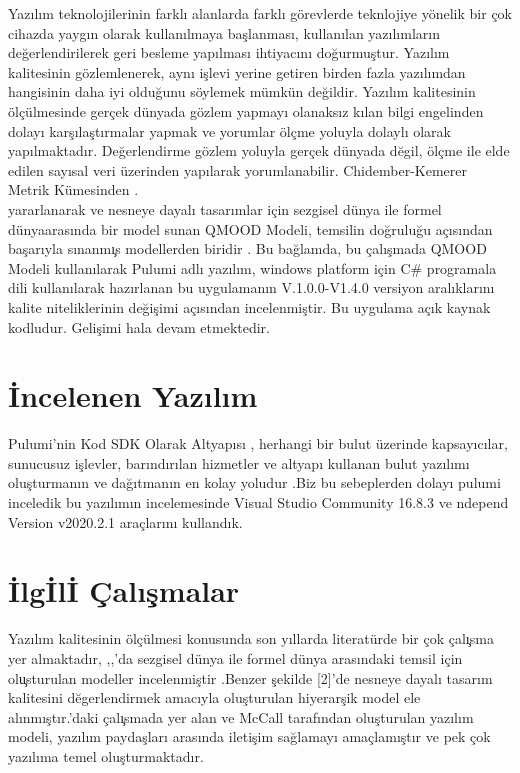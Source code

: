 \documentclass[conference]{IEEEtran}
\begin{document}
Yazılım teknolojilerinin farklı alanlarda farklı görevlerde teknlojiye yönelik bir çok cihazda yaygın olarak kullanılmaya başlanması, kullanılan yazılımların değerlendirilerek geri besleme yapılması ihtiyacını doğurmuştur. Yazılım  kalitesinin gözlemlenerek, aynı işlevi yerine getiren birden fazla yazılımdan hangisinin daha iyi olduğunu söylemek mümkün değildir. Yazılım kalitesinin ölçülmesinde gerçek dünyada gözlem yapmayı olanaksız kılan bilgi engelinden dolayı karşılaştırmalar yapmak ve yorumlar ölçme yoluyla dolaylı olarak yapılmaktadır. Değerlendirme gözlem yoluyla gerçek dünyada dĕgil, ölçme  ile elde  edilen sayısal veri üzerinden yapılarak yorumlanabilir. Chidember-Kemerer  Metrik  Kümesinden \cite{label1}.\\  yararlanarak  ve nesneye dayalı tasarımlar için sezgisel dünya ile formel dünyaarasında  bir  model  sunan  QMOOD  Modeli,  temsilin doğruluğu  açısından başarıyla  sınanmı̧s  modellerden  biridir  \cite{label2}.
Bu bağlamda, bu çalışmada QMOOD Modeli kullanılarak Pulumi adlı yazılım, windows platform için C# programala dili kullanılarak hazırlanan bu uygulamanın V.1.0.0-V1.4.0 versiyon aralıklarını kalite niteliklerinin değişimi açısından incelenmiştir. Bu uygulama açık kaynak kodludur. Gelişimi hala devam etmektedir.


\section{İncelenen Yazılım}
Pulumi'nin Kod SDK Olarak Altyapısı , herhangi bir bulut üzerinde kapsayıcılar, sunucusuz işlevler, barındırılan hizmetler ve altyapı kullanan bulut yazılımı oluşturmanın ve dağıtmanın en kolay yoludur \cite{label3}.Biz bu sebeplerden dolayı pulumi inceledik bu yazılımın incelemesinde Visual Studio Community 16.8.3 ve ndepend Version v2020.2.1 araçlarını kullandık.

\section{İlgİlİ Çalışmalar}
Yazılım kalitesinin ölçülmesi konusunda son yıllarda literatürde bir çok çalı̧sma yer almaktadır\cite{label5},
\cite{label6},\cite{label7},\cite{label8}’da sezgisel dünya ile formel dünya arasındaki temsil için olu̧sturulan modeller incelenmiştir .Benzer şekilde [2]'de nesneye dayalı tasarım kalitesini dĕgerlendirmek amacıyla oluşturulan hiyerarşik model ele alınmıştır.\cite{label9}’daki çalı̧smada yer alan ve McCall tarafından oluşturulan yazılım modeli, yazılım paydaşları arasında iletişim sağlamayı amaçlamıştır ve pek çok yazılıma temel oluşturmaktadır.
\end{document}
